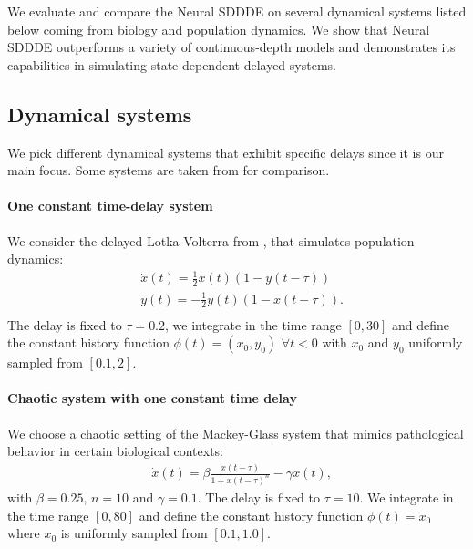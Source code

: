 We evaluate and compare the Neural SDDDE on several dynamical systems listed below coming from biology and population dynamics. We show that Neural SDDDE outperforms a variety of continuous-depth models and demonstrates its capabilities in simulating state-dependent delayed systems.


\subsection{Dynamical systems}\label{ssec:system_exp}
We pick different dynamical systems that exhibit specific delays since it is our main focus. Some systems are taken from \cite{neural_laplace} for comparison.

\paragraph{One constant time-delay system} We consider the delayed Lotka-Volterra from \cite{lk_dde}, that simulates population dynamics:
%
\begin{equation}
\begin{aligned}
&\dot{x}(t) = \frac{1}{2} x(t) ( 1  - y(t-\tau)) \\
&\dot{y}(t) = -\frac{1}{2} y(t)( 1  - x(t-\tau)). \\
\end{aligned}
\end{equation}
%
The delay is fixed to $\tau=0.2$, we integrate in the time range $[0,30]$ and define the constant history function $\phi(t) = (x_0, y_0)$ $\forall t<0$ with $x_0$ and $y_0$ uniformly sampled from $[0.1,2]$.

\paragraph{Chaotic system with one constant time delay} We choose a chaotic setting of the Mackey-Glass system \citep{mackey_glass} that mimics pathological behavior in certain biological contexts:
%
\begin{equation}
\begin{aligned}
&\dot{x}(t) = \beta \frac{x(t-\tau)}{1 + x(t-\tau)^n} - \gamma x(t),
\end{aligned}
\end{equation}
%
with $\beta=0.25$, $n=10$ and $\gamma=0.1$. The delay is fixed to $\tau= 10$. We integrate in the time range $[0,80]$ and define the constant history function  $\phi(t) = x_0$ where $x_0$ is uniformly sampled from $[0.1,1.0]$.

